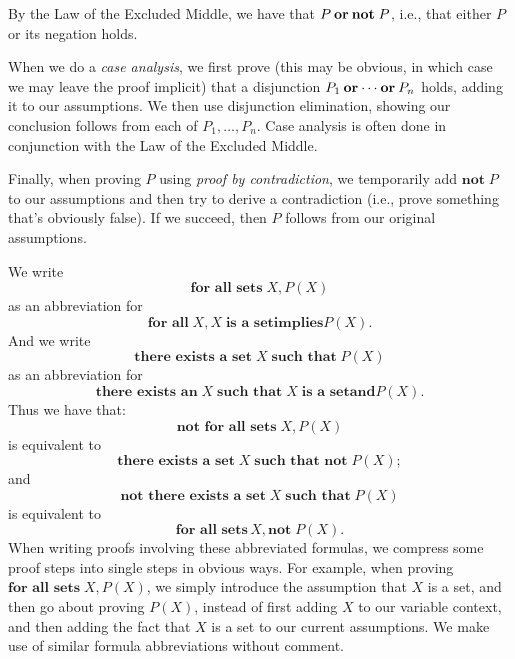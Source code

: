 By the Law of the Excluded Middle, we have that $P\mathbin{\mathbf{or}} \textbf{not}\;P$,
%
%
i.e., that either $P$ or its negation holds.

When we do a \emph{case analysis}, we first prove (this may be
%
%
obvious, in which case we may leave the proof implicit) that a
disjunction $P_1 \mathbin{\mathbf{or}} \cdots \mathbin{\mathbf{or}} P_n$ holds, adding it to our
assumptions. We then use disjunction elimination, showing our
conclusion follows from each of $P_1,\ldots,P_n$.  Case analysis is
often done in conjunction with the Law of the Excluded Middle.

Finally, when proving $P$ using \emph{proof by contradiction}, we
%
%
temporarily add $\textbf{not}\;P$ to our assumptions and then try to
derive a contradiction (i.e., prove something that's obviously
false). If we succeed, then $P$ follows from our original assumptions.

We write
\begin{displaymath}
  \textbf{for all sets}\; X, P(X)
\end{displaymath}
as an abbreviation for
\begin{displaymath}
  \textbf{for all}\; X, X\; \textbf{is a set} \mathbin{\textbf{implies}} P(X) .
\end{displaymath}
And we write 
\begin{displaymath}
  \textbf{there exists a set}\; X \;\textbf{such that}\; P(X)
\end{displaymath}
as an abbreviation for
\begin{displaymath}
  \textbf{there exists an} \; X \;\textbf{such that}\;
  X \;\textbf{is a set} \mathbin{\textbf{and}} P(X) .
\end{displaymath}
Thus we have that:
\begin{displaymath}
  \textbf{not for all sets}\; X, P(X)
\end{displaymath}
is equivalent to
\begin{displaymath}
  \textbf{there exists a set}\; X \; \textbf{such that not}\; P(X);
\end{displaymath}
and
\begin{displaymath}
  \textbf{not there exists a set}\; X \;\textbf{such that}\; P(X)
\end{displaymath}
is equivalent to
\begin{displaymath}
  \textbf{for all sets}\, X, \textbf{not}\; P(X) .
\end{displaymath}
When writing proofs involving these abbreviated formulas, we compress
some proof steps into single steps in obvious ways.  For example, when
proving $\textbf{for all sets}\; X, P(X)$, we simply introduce the
assumption that $X$ is a set, and then go about proving $P(X)$,
instead of first adding $X$ to our variable context, and then adding
the fact that $X$ is a set to our current assumptions.  We make use of
similar formula abbreviations without comment.
%
%

